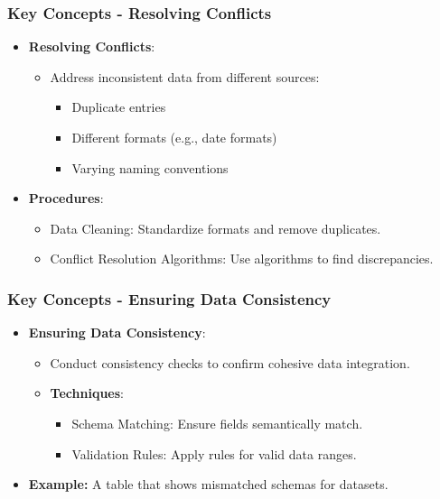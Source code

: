 \documentclass[aspectratio=169]{beamer}
\begin{document}
\begin{frame}
    \frametitle{Key Concepts - Resolving Conflicts}
    \begin{itemize}
        \item \textbf{Resolving Conflicts}:
        \begin{itemize}
            \item Address inconsistent data from different sources:
            \begin{itemize}
                \item Duplicate entries
                \item Different formats (e.g., date formats)
                \item Varying naming conventions
            \end{itemize}
        \end{itemize}
        \item \textbf{Procedures}:
        \begin{itemize}
            \item Data Cleaning: Standardize formats and remove duplicates.
            \item Conflict Resolution Algorithms: Use algorithms to find discrepancies.
        \end{itemize}
    \end{itemize}
\end{frame}

\begin{frame}
    \frametitle{Key Concepts - Ensuring Data Consistency}
    \begin{itemize}
        \item \textbf{Ensuring Data Consistency}:
        \begin{itemize}
            \item Conduct consistency checks to confirm cohesive data integration.
            \item \textbf{Techniques}:
            \begin{itemize}
                \item Schema Matching: Ensure fields semantically match.
                \item Validation Rules: Apply rules for valid data ranges.
            \end{itemize}
        \end{itemize}
        \item \textbf{Example:}
        A table that shows mismatched schemas for datasets.
    \end{itemize}
\end{frame}
\end{document}
